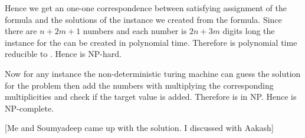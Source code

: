 \documentclass[a4paper, 11pt]{article}
\begin{document}
{Hence we get an one-one correspondence between satisfying assignment of the  formula and the solutions of the  instance we created from the formula. Since there are $n+2m+1$ numbers and each number is $2n+3m$ digits long the instance for the 	 can be created in polynomial time. Therefore  is polynomial time reducible to . Hence  is NP-hard.

Now for any  instance the non-deterministic turing machine can guess the solution for the problem then add the numbers with multiplying the corresponding multiplicities and check if the target value is added. Therefore  is in NP. Hence  is NP-complete.
}\parinf

[Me and Soumyadeep came up with the solution. I discussed with Aakash]\parinn
\end{document}
